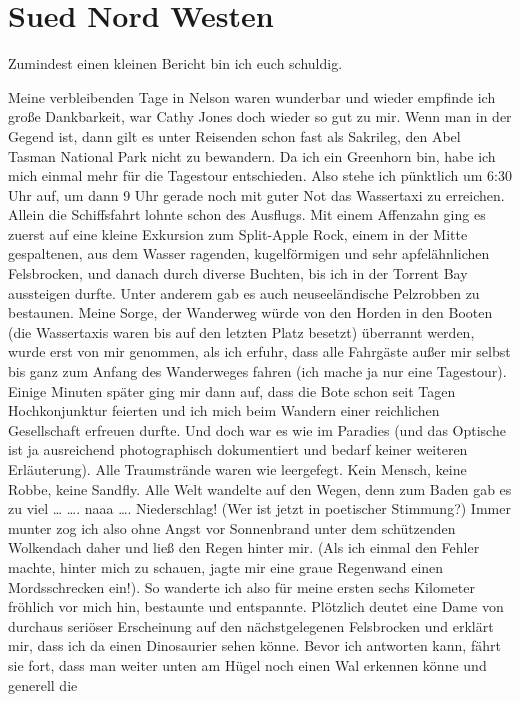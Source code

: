 \chapter{Sued Nord Westen}

Zumindest einen kleinen Bericht bin ich euch schuldig.

Meine verbleibenden Tage in Nelson waren wunderbar und wieder empfinde
ich große Dankbarkeit, war Cathy Jones doch wieder so gut zu mir. Wenn
man in der Gegend ist, dann gilt es unter Reisenden schon fast als
Sakrileg, den Abel Tasman National Park nicht zu bewandern. Da ich ein
Greenhorn bin, habe ich mich einmal mehr für die Tagestour entschieden.
Also stehe ich pünktlich um 6:30 Uhr auf, um dann 9 Uhr gerade noch mit
guter Not das Wassertaxi zu erreichen. Allein die Schiffsfahrt lohnte
schon des Ausflugs. Mit einem Affenzahn ging es zuerst auf eine kleine
Exkursion zum Split-Apple Rock, einem in der Mitte gespaltenen, aus dem
Wasser ragenden, kugelförmigen und sehr apfelähnlichen Felsbrocken, und
danach durch diverse Buchten, bis ich in der Torrent Bay aussteigen
durfte. Unter anderem gab es auch neuseeländische Pelzrobben zu
bestaunen. Meine Sorge, der Wanderweg würde von den Horden in den Booten
(die Wassertaxis waren bis auf den letzten Platz besetzt) überrannt
werden, wurde erst von mir genommen, als ich erfuhr, dass alle Fahrgäste
außer mir selbst bis ganz zum Anfang des Wanderweges fahren (ich mache
ja nur eine Tagestour). Einige Minuten später ging mir dann auf, dass
die Bote schon seit Tagen Hochkonjunktur feierten und ich mich beim
Wandern einer reichlichen Gesellschaft erfreuen durfte. Und doch war es
wie im Paradies (und das Optische ist ja ausreichend photographisch
dokumentiert und bedarf keiner weiteren Erläuterung). Alle Traumstrände
waren wie leergefegt. Kein Mensch, keine Robbe, keine Sandfly. Alle Welt
wandelte auf den Wegen, denn zum Baden gab es zu viel \ldots{} \ldots.
naaa \ldots. Niederschlag! (Wer ist jetzt in poetischer Stimmung?) Immer
munter zog ich also ohne Angst vor Sonnenbrand unter dem schützenden
Wolkendach daher und ließ den Regen hinter mir. (Als ich einmal den
Fehler machte, hinter mich zu schauen, jagte mir eine graue Regenwand
einen Mordsschrecken ein!). So wanderte ich also für meine ersten sechs
Kilometer fröhlich vor mich hin, bestaunte und entspannte. Plötzlich
deutet eine Dame von durchaus seriöser Erscheinung auf den
nächstgelegenen Felsbrocken und erklärt mir, dass ich da einen
Dinosaurier sehen könne. Bevor ich antworten kann, fährt sie fort, dass
man weiter unten am Hügel noch einen Wal erkennen könne und generell die
